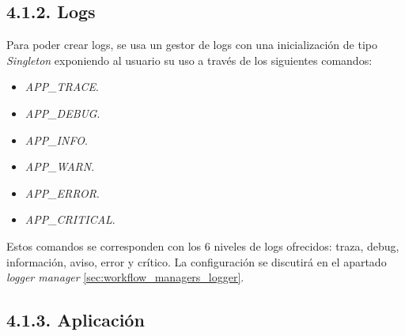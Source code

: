 \subsection*{4.1.2. Logs}\label{sec:workflow_init_logger}

Para poder crear logs, se usa un gestor de logs con una inicialización de tipo \textit{Singleton}\cite{singleton-pattern} exponiendo al usuario su uso
a través de los siguientes comandos:
\begin{itemize}
    \item \textit{APP\_TRACE}.
    \item \textit{APP\_DEBUG}.
    \item \textit{APP\_INFO}.
    \item \textit{APP\_WARN}.
    \item \textit{APP\_ERROR}.
    \item \textit{APP\_CRITICAL}.
\end{itemize}
Estos comandos se corresponden con los 6 niveles de logs ofrecidos: traza, debug, información, aviso, error y crítico.
La configuración se discutirá en el apartado \textit{logger manager} \ref{sec:workflow_managers_logger}.

\subsection*{4.1.3. Aplicación}\label{sec:workflow_init_application}

